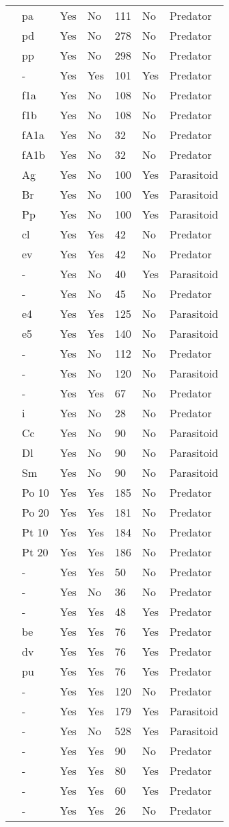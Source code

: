 \begin{table}[!tbp]
\begin{center}
\begin{tabular}{lllllll}
\citet{Eveleigh:1982aa}&pa&Yes&No&111&No&Predator\tabularnewline
\citet{Eveleigh:1982aa}&pd&Yes&No&278&No&Predator\tabularnewline
\citet{Eveleigh:1982aa}&pp&Yes&No&298&No&Predator\tabularnewline
\citet{Fussmann:2005aa}&-&Yes&Yes&101&Yes&Predator\tabularnewline
\citet{Griffen:2007aa}&f1a&Yes&No&108&No&Predator\tabularnewline
\citet{Griffen:2007aa}&f1b&Yes&No&108&No&Predator\tabularnewline
\citet{Griffen:2007aa}&fA1a&Yes&No&32&No&Predator\tabularnewline
\citet{Griffen:2007aa}&fA1b&Yes&No&32&No&Predator\tabularnewline
\citet{Hassan:1976aa}&Ag&Yes&No&100&Yes&Parasitoid\tabularnewline
\citet{Hassan:1976aa}&Br&Yes&No&100&Yes&Parasitoid\tabularnewline
\citet{Hassan:1976aa}&Pp&Yes&No&100&Yes&Parasitoid\tabularnewline
\citet{Hossie:2016aa}&cl&Yes&Yes&42&No&Predator\tabularnewline
\citet{Hossie:2016aa}&ev&Yes&Yes&42&No&Predator\tabularnewline
\citet{Huffaker:1982aa}&-&Yes&No&40&Yes&Parasitoid\tabularnewline
\citet{Johnson:2006aa}&-&Yes&No&45&No&Predator\tabularnewline
\citet{Jones:1988aa}&e4&Yes&Yes&125&No&Parasitoid\tabularnewline
\citet{Jones:1988aa}&e5&Yes&Yes&140&No&Parasitoid\tabularnewline
\citet{Katz:1985ai}&-&Yes&No&112&No&Predator\tabularnewline
\citet{Kfir:1983aa}&-&Yes&No&120&No&Parasitoid\tabularnewline
\citet{Kratina:2009aa}&-&Yes&Yes&67&No&Predator\tabularnewline
\citet{Krylov:1992aa}&i&Yes&No&28&No&Predator\tabularnewline
\citet{Kumar:1985aa}&Cc&Yes&No&90&No&Parasitoid\tabularnewline
\citet{Kumar:1985aa}&Dl&Yes&No&90&No&Parasitoid\tabularnewline
\citet{Kumar:1985aa}&Sm&Yes&No&90&No&Parasitoid\tabularnewline
\citet{Lang:2012aa}&Po 10&Yes&Yes&185&No&Predator\tabularnewline
\citet{Lang:2012aa}&Po 20&Yes&Yes&181&No&Predator\tabularnewline
\citet{Lang:2012aa}&Pt 10&Yes&Yes&184&No&Predator\tabularnewline
\citet{Lang:2012aa}&Pt 20&Yes&Yes&186&No&Predator\tabularnewline
\citet{Long:2012aa}&-&Yes&Yes&50&No&Predator\tabularnewline
\citet{Mansour:1991aa}&-&Yes&No&36&No&Predator\tabularnewline
\citet{Medoc:2013aa}&-&Yes&Yes&48&Yes&Predator\tabularnewline
\citet{Medoc:2015aa}&be&Yes&Yes&76&Yes&Predator\tabularnewline
\citet{Medoc:2015aa}&dv&Yes&Yes&76&Yes&Predator\tabularnewline
\citet{Medoc:2015aa}&pu&Yes&Yes&76&Yes&Predator\tabularnewline
\citet{Mertz:1968aa}&-&Yes&Yes&120&No&Predator\tabularnewline
\citet{Mills:2004aa}&-&Yes&Yes&179&Yes&Parasitoid\tabularnewline
\citet{Montoya:2000aa}&-&Yes&No&528&Yes&Parasitoid\tabularnewline
\citet{Omkar:2004aa}&-&Yes&Yes&90&No&Predator\tabularnewline
\citet{Prokopenko:2017aa}&-&Yes&Yes&80&Yes&Predator\tabularnewline
\citet{Pusack:2018aa}&-&Yes&Yes&60&Yes&Predator\tabularnewline
\citet{Reeve:1997aa}&-&Yes&Yes&26&No&Predator\tabularnewline

\end{tabular}
\end{center}
\end{table}
